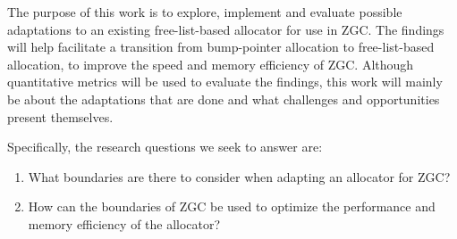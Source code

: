 
The purpose of this work is to explore, implement and evaluate possible adaptations to an existing free-list-based allocator for use in ZGC. The findings will help facilitate a transition from bump-pointer allocation to free-list-based allocation, to improve the speed and memory efficiency of ZGC. Although quantitative metrics will be used to evaluate the findings, this work will mainly be about the adaptations that are done and what challenges and opportunities present themselves.

Specifically, the research questions we seek to answer are:

\begin{enumerate}
    \item What boundaries are there to consider when adapting an allocator for ZGC?
    \item How can the boundaries of ZGC be used to optimize the performance and memory efficiency of the allocator?
\end{enumerate}

